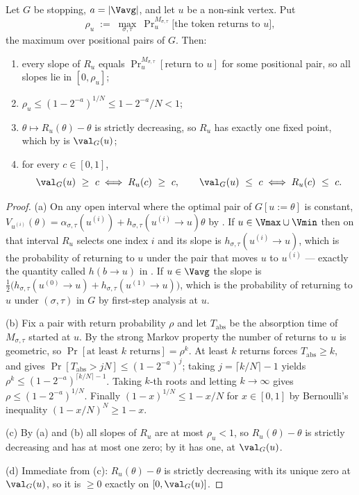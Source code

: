 \begin{theorem}\label{thm:bv-contract}
Let $G$ be stopping, $a=|\Vavg|$, and let $u$ be a non-sink vertex. Put
\[
  \rho_u\;:=\;\max_{\sigma,\tau}\ \Pr\nolimits^{M_{\sigma,\tau}}_{u}
       \bigl[\text{the token returns to } u\bigr] ,
\]
the maximum over positional pairs of $G$. Then:
\begin{enumerate}[label=(\alph*),leftmargin=2.2em]
\item every slope of $R_u$ equals $\Pr^{M_{\sigma,\tau}}_{u}[\text{return to }u]$
      for some positional pair, so all slopes lie in $[0,\rho_u]$;
\item $\rho_u\le(1-2^{-a})^{1/N}\le 1-2^{-a}/N<1$;
\item $\theta\mapsto R_u(\theta)-\theta$ is strictly decreasing, so $R_u$
      has exactly one fixed point, which by  is $\val_G(u)$;
\item for every $c\in[0,1]$,
      \[
        \val_G(u)\ \ge\ c \iff R_u(c)\ \ge\ c,
        \qquad
        \val_G(u)\ \le\ c \iff R_u(c)\ \le\ c .
      \]
\end{enumerate}
\end{theorem}

\begin{proof}
(a) On any open interval where the optimal pair of $G[u{:=}\theta]$ is
constant, $V_{u^{(i)}}(\theta)=\alpha_{\sigma,\tau}(u^{(i)})+
h_{\sigma,\tau}(u^{(i)}\to u)\theta$ by . If
$u\in\Vmax\cup\Vmin$ then on that interval $R_u$ selects one index $i$
and its slope is $h_{\sigma,\tau}(u^{(i)}\to u)$, which is the
probability of returning to $u$ under the pair that moves $u$ to
$u^{(i)}$ --- exactly the quantity called $h(b\to u)$ in
. If $u\in\Vavg$ the slope is
$\tfrac12\bigl(h_{\sigma,\tau}(u^{(0)}\to u)+h_{\sigma,\tau}(u^{(1)}\to u)\bigr)$,
which is the probability of returning to $u$ under $(\sigma,\tau)$ in $G$
by first-step analysis at $u$.

(b) Fix a pair with return probability $\rho$ and let $T_{\mathrm{abs}}$
be the absorption time of $M_{\sigma,\tau}$ started at $u$. By the strong
Markov property the number of returns to $u$ is geometric, so
$\Pr[\text{at least }k\text{ returns}]=\rho^{k}$. At least $k$ returns
forces $T_{\mathrm{abs}}\ge k$, and  gives
$\Pr[T_{\mathrm{abs}}>jN]\le(1-2^{-a})^{j}$; taking
$j=\lceil k/N\rceil-1$ yields
$\rho^{k}\le(1-2^{-a})^{\lceil k/N\rceil-1}$. Taking $k$-th roots and
letting $k\to\infty$ gives $\rho\le(1-2^{-a})^{1/N}$. Finally
$(1-x)^{1/N}\le 1-x/N$ for $x\in[0,1]$ by Bernoulli's inequality
$(1-x/N)^{N}\ge1-x$.

(c) By (a) and (b) all slopes of $R_u$ are at most $\rho_u<1$, so
$R_u(\theta)-\theta$ is strictly decreasing and has at most one zero; by
 it has one, at $\val_G(u)$.

(d) Immediate from (c): $R_u(\theta)-\theta$ is strictly decreasing with
its unique zero at $\val_G(u)$, so it is $\ge0$ exactly on
$[0,\val_G(u)]$.
\end{proof}

